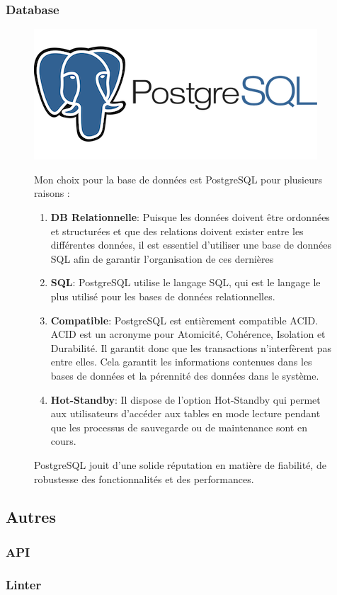 \subsubsection{Database}

\begin{figure}[H]
  \begin{minipage}{.3\textwidth}
    \includegraphics[width=0.75\linewidth]{img/tech/PostgreSql.png} 
  \end{minipage} 
  \begin{minipage}{.7\textwidth}
    Mon choix pour la base de données est PostgreSQL pour plusieurs raisons :
    \begin{enumerate}
      \item \textbf{DB Relationnelle}: Puisque les données doivent être ordonnées et structurées et que des relations doivent exister entre les différentes données, il est essentiel d'utiliser une base de données SQL afin de garantir l'organisation de ces dernières
      \item \textbf{SQL}: PostgreSQL utilise le langage SQL, qui est le langage le plus utilisé pour les bases de données relationnelles.
      \item \textbf{Compatible}: PostgreSQL est entièrement compatible ACID. ACID est un acronyme pour Atomicité, Cohérence, Isolation et Durabilité. Il garantit donc que les transactions n'interfèrent pas entre elles. Cela garantit les informations contenues dans les bases de données et la pérennité des données dans le système.
      \item \textbf{Hot-Standby}: Il dispose de l'option Hot-Standby qui permet aux utilisateurs d'accéder aux tables en mode lecture pendant que les processus de sauvegarde ou de maintenance sont en cours.

    \end{enumerate}
    PostgreSQL jouit d'une solide réputation en matière de fiabilité, de robustesse des fonctionnalités et des performances.
  \end{minipage} 
\end{figure}


  
\subsection{Autres}
\subsubsection{API}
\subsubsection{Linter}